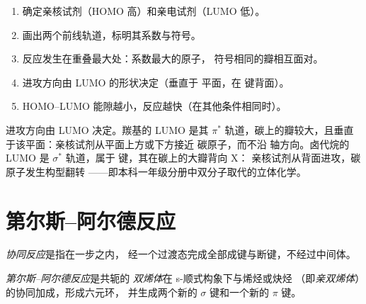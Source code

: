 \begin{method}[前线轨道分析]\label{met:b2:frontier-orbitals:fmo}
\begin{enumerate}
  \item 确定亲核试剂（HOMO 高）和亲电试剂（LUMO 低）。
  \item 画出两个前线轨道，标明其系数与符号。
  \item 反应发生在重叠最大处：系数最大的原子，
        符号相同的瓣相互面对。
  \item 进攻方向由 LUMO 的形状决定（垂直于
         平面，在  键背面）。
  \item HOMO--LUMO 能隙越小，反应越快（在其他条件相同时）。
\end{enumerate}
\end{method}

进攻方向由 LUMO 决定。羰基的 LUMO 是其
$\pi^*$ 轨道，碳上的瓣较大，且垂直于该平面：亲核试剂从平面上方或下方接近
碳原子，而不沿  轴方向。卤代烷的 LUMO 是
$\sigma^*$ 轨道，属于  键，其在碳上的大瓣背向 X：
亲核试剂从背面进攻，碳原子发生构型翻转
——即本科一年级分册中双分子取代的立体化学。

\section{第尔斯–阿尔德反应}

\begin{definition}[协同反应]\label{def:b2:frontier-orbitals:concerted}
\emph{协同反应}是指在一步之内，
经一个过渡态完成全部成键与断键，不经过中间体。
\end{definition}

\begin{definition}\label{def:b2:frontier-orbitals:diels-alder}
\emph{第尔斯–阿尔德反应}是共轭的
\emph{双烯体}在 s-顺式构象下与烯烃或炔烃
（即\emph{亲双烯体}）的协同加成，形成六元环，
并生成两个新的 $\sigma$ 键和一个新的 $\pi$ 键。
\end{definition}

